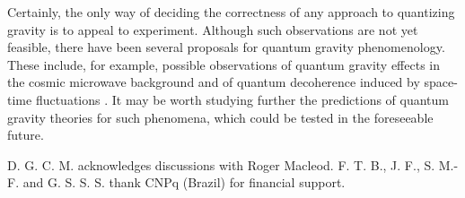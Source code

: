 \documentclass[longbibliography,groupedaddress,showpacs,showkeys,amssymb,eqsecnum,aps,nofootinbib,superscriptaddress]{revtex4}
\begin{document}
%

Certainly, the only way of deciding the correctness of any
approach to quantizing gravity is to appeal to experiment.
Although such observations are not yet feasible,  there have been
several proposals for quantum gravity phenomenology.  These
include, for example,  possible observations of quantum gravity
effects in the cosmic microwave background \cite{Akhmedov2014} and 
of quantum decoherence induced by space-time fluctuations 
\cite{Oniga:2017pyq}.  
It may be worth studying further the predictions of quantum gravity
theories for such phenomena, which could be tested in the foreseeable future.

\begin{acknowledgments}
{D. G. C. M. acknowledges discussions with Roger Macleod.
F. T. B.,  J. F.,  S. M.-F. and G. S. S. S.  thank CNPq (Brazil) for financial support.}
\end{acknowledgments}
\end{document}

